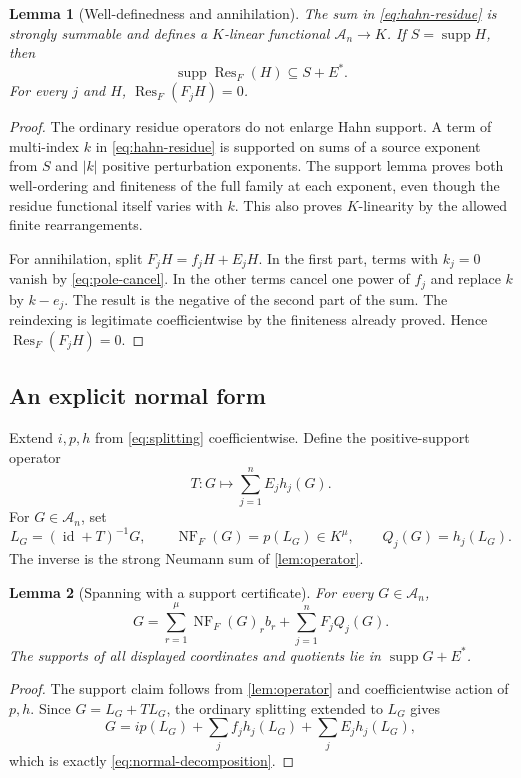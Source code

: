 \documentclass[11pt,letterpaper]{article}
\newtheorem{lemma}[lemma]{Lemma}
\theoremstyle{definition}
\theoremstyle{remark}
\newcommand{\A}{\mathscr A}
\newcommand{\Res}{\operatorname{Res}}
\newcommand{\supp}{\operatorname{supp}}
\newcommand{\id}{\operatorname{id}}
\newcommand{\NF}{\operatorname{NF}}
\numberwithin{equation}{section}
\begin{document}
\begin{lemma}[Well-definedness and annihilation]\label{lem:residue-annihilate}
The sum in \eqref{eq:hahn-residue} is strongly summable and defines a $K$-linear functional $\A_n\to K$. If $S=\supp H$, then
\[
 \supp\Res_F(H)\subseteq S+E^*.
\]
For every $j$ and $H$, $\Res_F(F_jH)=0$.
\end{lemma}
\begin{proof}
The ordinary residue operators do not enlarge Hahn support. A term of multi-index $k$ in \eqref{eq:hahn-residue} is supported on sums of a source exponent from $S$ and $|k|$ positive perturbation exponents. The support lemma proves both well-ordering and finiteness of the full family at each exponent, even though the residue functional itself varies with $k$. This also proves $K$-linearity by the allowed finite rearrangements.

For annihilation, split $F_jH=f_jH+E_jH$. In the first part, terms with $k_j=0$ vanish by \eqref{eq:pole-cancel}. In the other terms cancel one power of $f_j$ and replace $k$ by $k-e_j$. The result is the negative of the second part of the sum. The reindexing is legitimate coefficientwise by the finiteness already proved. Hence $\Res_F(F_jH)=0$.
\end{proof}

\subsection{An explicit normal form}
Extend $i,p,h$ from \eqref{eq:splitting} coefficientwise. Define the positive-support operator
\begin{equation}\label{eq:T}
 T:G\longmapsto\sum_{j=1}^n E_jh_j(G).
\end{equation}
For $G\in\A_n$, set
\begin{equation}\label{eq:normal-form}
 L_G=(\id+T)^{-1}G,\qquad
 \NF_F(G)=p(L_G)\in K^\mu,\qquad
 Q_j(G)=h_j(L_G).
\end{equation}
The inverse is the strong Neumann sum of \cref{lem:operator}.

\begin{lemma}[Spanning with a support certificate]\label{lem:spanning}
For every $G\in\A_n$,
\begin{equation}\label{eq:normal-decomposition}
 G=\sum_{r=1}^\mu\NF_F(G)_r b_r
   +\sum_{j=1}^nF_jQ_j(G).
\end{equation}
The supports of all displayed coordinates and quotients lie in $\supp G+E^*$.
\end{lemma}
\begin{proof}
The support claim follows from \cref{lem:operator} and coefficientwise action of $p,h$. Since $G=L_G+T L_G$, the ordinary splitting extended to $L_G$ gives
\[
 G=i p(L_G)+\sum_jf_jh_j(L_G)+\sum_jE_jh_j(L_G),
\]
which is exactly \eqref{eq:normal-decomposition}.
\end{proof}
\end{document}
